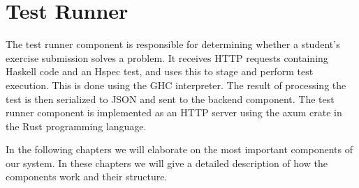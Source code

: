 \section{Test Runner}
The test runner component is responsible for determining whether a student's exercise submission solves a problem.
It receives HTTP requests containing Haskell code and an Hspec test, and uses this to stage and perform test execution. 
This is done using the GHC interpreter.
The result of processing the test is then serialized to JSON and sent to the backend component.
The test runner component is implemented as an HTTP server using the axum crate in the Rust programming language.

In the following chapters we will elaborate on the most important components of our system. In these chapters we will give a detailed description of how the components work and their structure.